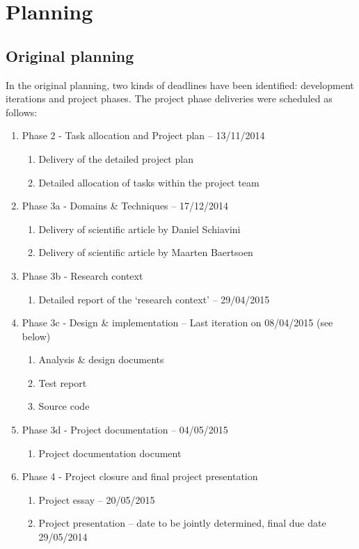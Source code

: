 
\section{Planning}
\subsection{Original planning}
In the original planning, two kinds of deadlines have been identified: development iterations and project phases.
The project phase deliveries were scheduled as follows:
 \begin{enumerate}
	\item Phase 2 - Task allocation and Project plan			-- 	13/11/2014
 	\begin{enumerate}
		\item Delivery of the detailed project plan 			
		\item Detailed allocation of tasks within the project team 
	\end {enumerate}
	\item Phase 3a - Domains \& Techniques					-- 	17/12/2014
 	\begin{enumerate}
		\item Delivery of scientific article by Daniel Schiavini
		\item Delivery of scientific article by Maarten Baertsoen
	\end {enumerate}
 	\item Phase 3b - Research context
 	\begin{enumerate}
		\item Detailed report of the `research context'  		-- 	29/04/2015
	\end {enumerate}
 	\item Phase 3c - Design \& implementation				-- Last iteration on 08/04/2015 (see below)
 	\begin{enumerate}
		\item Analysis \& design documents
		\item Test report
		\item Source code
	\end {enumerate}
 	\item Phase 3d - Project documentation					-- 	04/05/2015
 	\begin{enumerate}
		\item Project documentation document	
	\end {enumerate}
	\item Phase 4 - Project closure and final project presentation
 	\begin{enumerate}
		\item Project essay							-- 	20/05/2015
		\item Project presentation						-- 	date to be jointly determined, final due date 29/05/2014
	\end {enumerate}
\end {enumerate}
